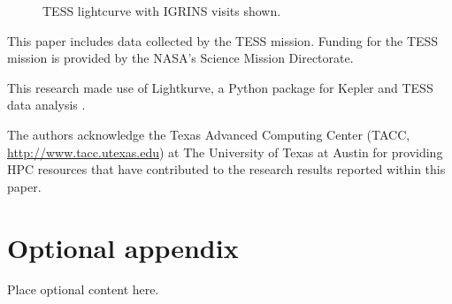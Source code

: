 \documentclass[modern]{aastex631}
\begin{document}
\begin{figure}[htb]
  \caption{\label{TESS_UCAC2} TESS lightcurve with IGRINS visits shown.}
\end{figure}

\begin{acknowledgements}
  This paper includes data collected by the TESS mission. Funding for the TESS mission is provided by the NASA's Science Mission Directorate.

  This research made use of Lightkurve, a Python package for Kepler and TESS data analysis \citep{2018ascl.soft12013L}.

  The authors acknowledge the Texas Advanced Computing Center (TACC, \url{http://www.tacc.utexas.edu}) at The University of Texas at Austin for providing HPC resources that have contributed to the research results reported within this paper.
\end{acknowledgements}

\clearpage








\clearpage

\appendix
\restartappendixnumbering

\section{Optional appendix} \label{appendix:tools}

Place optional content here.
\end{document}
